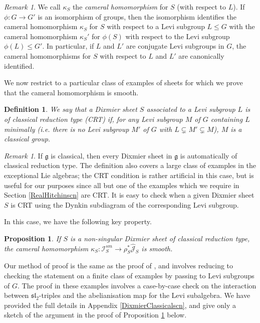 \documentclass{amsart}
\newtheorem{proposition}[theorem]{Proposition}
\newtheorem{definition}[theorem]{Definition}
\theoremstyle{remark}
\newtheorem{remark}[theorem]{Remark}
\numberwithin{theorem}{section}
\numberwithin{equation}{section}
\begin{document}
\begin{remark}\label{CameralHomrmk}
    We call $\kappa_S$ the \emph{cameral homomorphism} for $S$ (with respect to $L$). If $\phi:G \rightarrow G'$ is an isomorphism of groups, then the isomorphism identifies the cameral homomorphism $\kappa_S$ for $S$ with respect to a Levi subgroup $L \leq G$ with the cameral homomorphism $\kappa_S'$ for $\phi(S)$ with respect to the Levi subgroup $\phi(L) \leq G'$. In particular, if $L$ and $L'$ are conjugate Levi subgroups in $G$, the cameral homomorphisms for $S$ with respect to $L$ and $L'$ are canonically identified.
\end{remark} 

We now restrict to a particular class of examples of sheets for which we prove that the cameral homomorphism is smooth.

\begin{definition}\label{ClassRamTypedef}
    We say that a Dixmier sheet $S$ associated to a Levi subgroup $L$ is of \emph{classical reduction type (CRT)} if, for any Levi subgroup $M$ of $G$ containing $L$ minimally  (i.e. there is no Levi subgroup $M'$ of $G$ with $L \subsetneq M' \subsetneq M$), $M$ is a classical group.
\end{definition}

\begin{remark}\label{ClassRamTypermk}
    If $\mathfrak{g}$ is classical, then every Dixmier sheet in $\mathfrak{g}$ is automatically of classical reduction type. The definition also covers a large class of examples in the exceptional Lie algebras; the CRT condition is rather artificial in this case, but is useful for our purposes since all but one of the examples which we require in Section \ref{RealHitchinscn} are CRT. It is easy to check when a given Dixmier sheet $S$ is CRT using the Dynkin subdiagram of the corresponding Levi subgroup.
\end{remark}

In this case, we have the following key property.

\begin{proposition}\label{CameralSmoothprp}
    If $S$ is a non-singular Dixmier sheet of classical reduction type, the cameral homomorphism $\kappa_S:\mathcal I_S^{sm} \rightarrow \rho_S^*\hat{\mathcal J}_S$ is smooth.
\end{proposition}

Our method of proof is the same as the proof of \cite[Proposition 2.4.7]{Ngo2}, and involves reducing to checking the statement on a finite class of examples by passing to Levi subgroups of $G$. The proof in these examples involves a case-by-case check on the interaction between $\mathfrak{sl}_2$-triples and the abelianisation map for the Levi subalgebra. We have provided the full details in Appendix \ref{DixmierClassicalscn}, and give only a sketch of the argument in the proof of Proposition \ref{CameralSmoothprp} below.  
\end{document}
